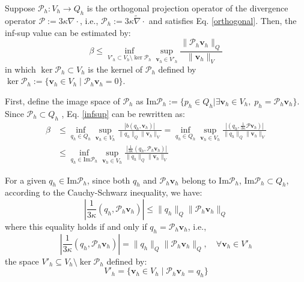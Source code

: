 \begin{lma}\label{lma}
Suppose $\mathcal{P}_h: V_h \rightarrow Q_h$ is the orthogonal projection operator of the divergence operator $\mathcal{P} := 3\kappa \nabla \cdot$, i.e., $\mathcal{P}_h := 3\kappa \tilde{\nabla} \cdot$ and satisfies Eq. \eqref{orthogonal}. Then, the inf-sup value can be estimated by:
\begin{equation}\label{r1}
\beta \le \inf_{V'_h \subset V_h \setminus \ker \mathcal{P}_h} \sup_{\boldsymbol{v}_h \in V'_h} \frac{\|\mathcal{P}_h \boldsymbol{v}_h\|_Q}{\|\boldsymbol{v}_h\|_V}
\end{equation}
in which $\ker \mathcal{P}_h \subset V_h$ is the kernel of $\mathcal{P}_h$ defined by $\ker \mathcal{P}_h := \{\boldsymbol{v}_h \in V_h \mid \mathcal{P}_h \boldsymbol{v}_h = 0\}$.
\end{lma}
\begin{pf}
First, define the image space of $\mathcal{P}_h$ as $\mathrm{Im}\mathcal{P}_h := \{p_h \in Q_h \vert \exists \boldsymbol{v}_h \in V_h, \; p_h = \mathcal{P}_h \boldsymbol{v}_h\}$.
Since $\mathcal{P}_h\subset Q_h$
, Eq. \eqref{infsup} can be rewritten as:
\begin{equation} \label{r11}
\begin{split}
\beta &\le \inf_{q_h \in Q_h} \sup_{\boldsymbol{v}_h \in V_h} \frac{|b(q_h, \boldsymbol{v}_h)|}{\|q_h\|_Q \|\boldsymbol{v}_h\|_V}
= \inf_{q_h \in Q_h} \sup_{\boldsymbol{v}_h \in V_h} \frac{|(q_h, \frac{1}{3\kappa} \mathcal{P} \boldsymbol{v}_h)|}{\|q_h\|_Q \|\boldsymbol{v}_h\|_V} \\
&\le \inf_{q_h \in \mathrm{Im} \mathcal{P}_h} \sup_{\boldsymbol{v}_h \in V_h} \frac{|\frac{1}{3\kappa} (q_h, \mathcal{P}_h \boldsymbol{v}_h)|}{\|q_h\|_Q \|\boldsymbol{v}_h\|_V}
\end{split}
\end{equation}

For a given $q_h \in \mathrm{Im} \mathcal{P}_h$, since both $q_h$ and $\mathcal{P}_h \boldsymbol v_h$ belong to $\mathrm{Im} \mathcal{P}_h$, $\mathrm{Im} \mathcal{P}_h \subset Q_h$, according to the Cauchy-Schwarz inequality, we have:
\begin{equation}
\left| \frac{1}{3\kappa} (q_h, \mathcal{P}_h \boldsymbol{v}_h) \right| \le \|q_h\|_Q \|\mathcal{P}_h \boldsymbol{v}_h\|_Q
\end{equation}
where this equality holds if and only if $q_h = \mathcal{P}_h \boldsymbol{v}_h$, i.e.,
\begin{equation}
\left| \frac{1}{3\kappa} (q_h, \mathcal{P}_h \boldsymbol{v}_h) \right| = \|q_h\|_Q \|\mathcal{P}_h \boldsymbol{v}_h\|_Q, \quad \forall \boldsymbol{v}_h \in V'_h
\end{equation}
the space $V'_h \subseteq V_h \setminus \ker \mathcal{P}_h$ defined by:
\begin{equation}
V'_h = \{\boldsymbol{v}_h \in V_h \mid \mathcal{P}_h \boldsymbol{v}_h = q_h\}
\end{equation}


\end{pf}
